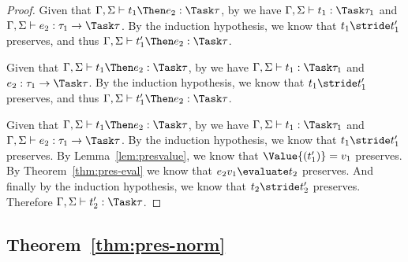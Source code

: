 \begin{proof}
  {Given that $\Gamma,\Sigma\infers t_1\Then e_2:\Task\tau$, by  we have $\Gamma,\Sigma\infers t_1:\Task\tau_1$ and $\Gamma,\Sigma\infers e_2:\tau_1\to\Task\tau$.
  By the induction hypothesis, we know that $t_1\stride t_1'$ preserves, and thus $\Gamma,\Sigma\infers t_1'\Then e_2:\Task\tau$.}

  {Given that $\Gamma,\Sigma\infers t_1\Then e_2:\Task\tau$,
  by  we have $\Gamma,\Sigma\infers t_1:\Task\tau_1$ and
  $e_2:\tau_1\to\Task\tau$. By the induction
  hypothesis, we know that $t_1\stride t_1'$ preserves, and thus
  $\Gamma,\Sigma\infers t_1'\Then e_2:\Task\tau$.}

  {Given that $\Gamma,\Sigma\infers t_1\Then e_2:\Task\tau$, by  we have
  $\Gamma,\Sigma\infers t_1:\Task\tau_1$ and
  $\Gamma,\Sigma\infers e_2:\tau_1\to\Task\tau$. By the induction hypothesis, we
  know that $t_1\stride t_1'$ preserves. By Lemma~\ref{lem:presvalue}, we know
  that $\Value{(t_1')}=v_1$ preserves. By Theorem~\ref{thm:pres-eval} we know
  that $e_2 v_1\evaluate t_2$ preserves. And finally by the induction hypothesis,
  we know that $t_2\stride t_2'$ preserves. Therefore
  $\Gamma,\Sigma\infers t_2':\Task\tau$.}

\end{proof}



\subsection{Theorem~\ref{thm:pres-norm}}

